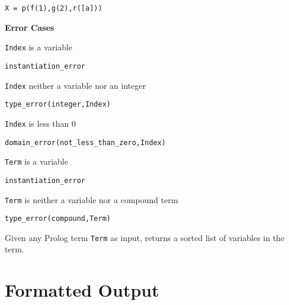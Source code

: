 \begin{description}
{\begin{verbatim}
X = p(f(1),g(2),r([a]))
\end{verbatim}
}

{\bf Error Cases} 
\bi
\item 	{\tt Index} is a variable
\bi
\item    {\tt instantiation\_error}
\ei
\item 	{\tt Index} neither a variable nor an integer
\bi
\item    {\tt type\_error(integer,Index)}
\ei
\item 	{\tt Index} is less than 0
\bi
\item    {\tt domain\_error(not\_less\_than\_zero,Index)}
\ei
\item 	{\tt Term} is a variable
\bi
\item    {\tt instantiation\_error}
\ei
\item 	{\tt Term} is neither a variable nor a compound term
\bi
\item    {\tt type\_error(compound,Term)}
\ei
\ei


% 
Given any Prolog term {\tt Term} as input, returns a sorted list of
variables in the term.  
\end{description}

\section{Formatted Output}

